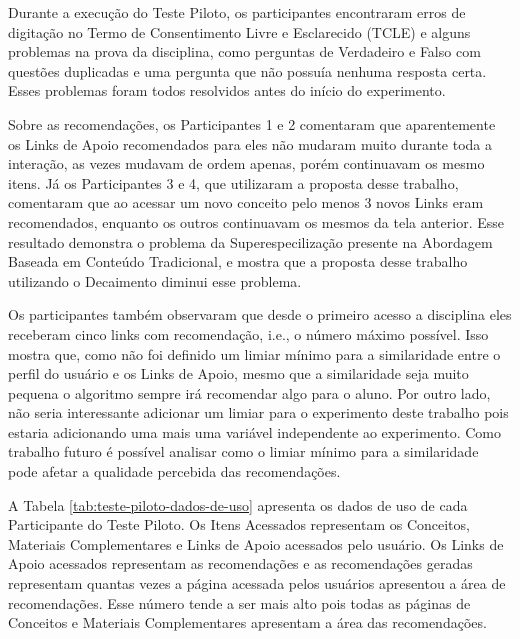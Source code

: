 Durante a execução do Teste Piloto, os participantes encontraram erros de digitação no Termo de Consentimento Livre e Esclarecido (TCLE)
e alguns problemas na prova da disciplina, como perguntas de Verdadeiro e Falso com questões duplicadas e uma
pergunta que não possuía nenhuma resposta certa. Esses problemas foram todos resolvidos antes do início do experimento.

Sobre as recomendações, os Participantes 1 e 2 comentaram que aparentemente os Links de Apoio recomendados para eles não
mudaram muito durante toda a interação, as vezes mudavam de ordem apenas, porém continuavam os mesmo itens. Já os Participantes
3 e 4, que utilizaram a proposta desse trabalho, comentaram que ao acessar um novo conceito pelo menos 3 novos Links eram
recomendados, enquanto os outros continuavam os mesmos da tela anterior. Esse resultado demonstra o problema da Superespecilização presente na Abordagem Baseada em Conteúdo Tradicional,
e mostra que a proposta desse trabalho utilizando o Decaimento diminui esse problema.

Os participantes também observaram que desde o primeiro acesso a disciplina eles receberam cinco links com recomendação, i.e.,
o número máximo possível. Isso mostra que, como não foi definido um limiar mínimo para a similaridade entre o perfil do usuário
e os Links de Apoio, mesmo que a similaridade seja muito pequena o algoritmo sempre irá recomendar algo para o aluno. Por
outro lado, não seria interessante adicionar um limiar para o experimento deste trabalho pois estaria adicionando uma
mais uma variável independente ao experimento. Como trabalho futuro é possível analisar como o limiar mínimo para a similaridade pode afetar
a qualidade percebida das recomendações.

A Tabela \ref{tab:teste-piloto-dados-de-uso} apresenta os dados de uso de cada Participante do Teste Piloto. Os Itens Acessados
representam os Conceitos, Materiais Complementares e Links de Apoio acessados pelo usuário. Os Links de Apoio acessados
representam as recomendações e as recomendações geradas representam quantas vezes a página acessada pelos usuários apresentou
a área de recomendações. Esse número tende a ser mais alto pois todas as páginas de Conceitos e Materiais Complementares
apresentam a área das recomendações.

